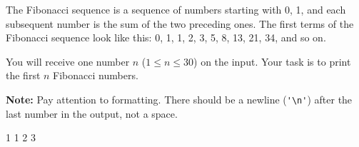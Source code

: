 




The Fibonacci sequence is a sequence of numbers starting with 0, 1, and each subsequent number is the sum of the two preceding ones. The first terms of the Fibonacci sequence look like this: 0, 1, 1, 2, 3, 5, 8, 13, 21, 34, and so on.

You will receive one number $n$ ($1\leq n\leq 30$) on the input. Your task is to print the first $n$ Fibonacci numbers.

\textbf{Note:} Pay attention to formatting. There should be a newline (\verb!'\n'!) after the last number in the output, not a space.

 1 1 2 3
\koniec


